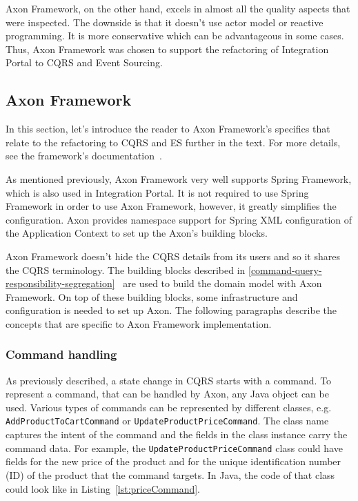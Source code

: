 \documentclass{book}
\begin{document}
Axon Framework, on the other hand, excels in almost all the quality
aspects that were inspected. The downside is that it doesn't use actor
model or reactive programming. It is more conservative which can be
advantageous in some cases. Thus, Axon Framework was chosen to support
the refactoring of Integration Portal to CQRS and Event Sourcing.


\subsection{Axon Framework}\label{axon-framework}

In this section, let's introduce the reader to Axon Framework's
specifics that relate to the refactoring to CQRS and ES further in the
text. For more details, see the framework's documentation~\cite{axon}.

As mentioned previously, Axon Framework very well supports Spring
Framework, which is also used in Integration Portal. It is not required
to use Spring Framework in order to use Axon Framework, however, it
greatly simplifies the configuration. Axon provides namespace support
for Spring XML configuration of the Application Context to set up the
Axon's building blocks.

Axon Framework doesn't hide the CQRS details from its users and so it
shares the CQRS terminology. The building blocks described in
\ref{command-query-responsibility-segregation}~ are used to build the
domain model with Axon Framework. On top of these building blocks, some
infrastructure and configuration is needed to set up Axon. The following
paragraphs describe the concepts that are specific to Axon Framework
implementation.


\subsubsection{Command handling}\label{command-handling}

As previously described, a state change in CQRS starts with a command.
To represent a command, that can be handled by Axon, any Java object can
be used. Various types of commands can be represented by different
classes, e.g. \texttt{AddProductToCartCommand} or
\texttt{UpdateProductPriceCommand}. The class name captures the intent
of the command and the fields in the class instance carry the command
data. For example, the \texttt{UpdateProductPriceCommand} class could
have fields for the new price of the product and for the unique
identification number (ID) of the product that the command targets. In
Java, the code of that class could look like in Listing~\ref{lst:priceCommand}.
\end{document}
